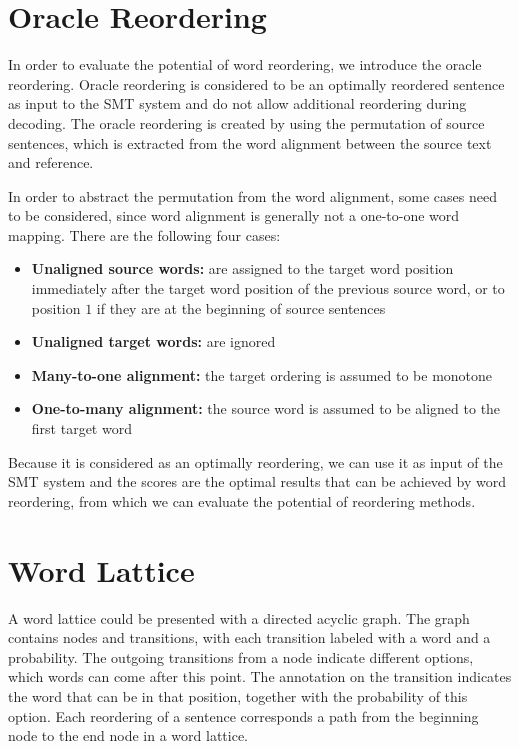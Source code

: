 \section{Oracle Reordering}
\label{ch:Foundations:sec:oracle}

In order to evaluate the potential of word reordering, we introduce the oracle reordering. Oracle reordering is considered to be an optimally reordered sentence as input to the \ac{SMT} system and do not allow additional reordering during decoding. \citep{combine} The oracle reordering is created by using the permutation of source sentences, which is extracted from the word alignment between the source text and reference.

In order to abstract the permutation from the word alignment, some cases need to be considered, since word alignment is generally not a one-to-one word mapping. There are the following four cases: \citep{birch2}

\begin{itemize}
\setlength{\itemsep}{0cm}%
\setlength{\parskip}{0cm}%
\item \textbf{Unaligned source words:} are assigned to the target word position immediately after the target word position of the previous source word, or to position $1$ if they are at the beginning of source sentences
\item \textbf{Unaligned target words:} are ignored
\item \textbf{Many-to-one alignment:} the target ordering is assumed to be monotone
\item \textbf{One-to-many alignment:} the source word is assumed to be aligned to the first target word
\end{itemize}

Because it is considered as an optimally reordering, we can use it as input of the \ac{SMT} system and the scores are the optimal results that can be achieved by word reordering, from which we can evaluate the potential of reordering methods.

\section{Word Lattice}
\label{ch:Foundations:sec:Lattices}
\label{latticecreation}
A word lattice could be presented with a directed acyclic graph. The graph contains nodes and transitions, with each transition labeled with a word and a probability. The outgoing transitions from a node indicate different options, which words can come after this point. The annotation on the transition indicates the word that can be in that position, together with the probability of this option. Each reordering of a sentence corresponds a path from the beginning node to the end node in a word lattice. %

